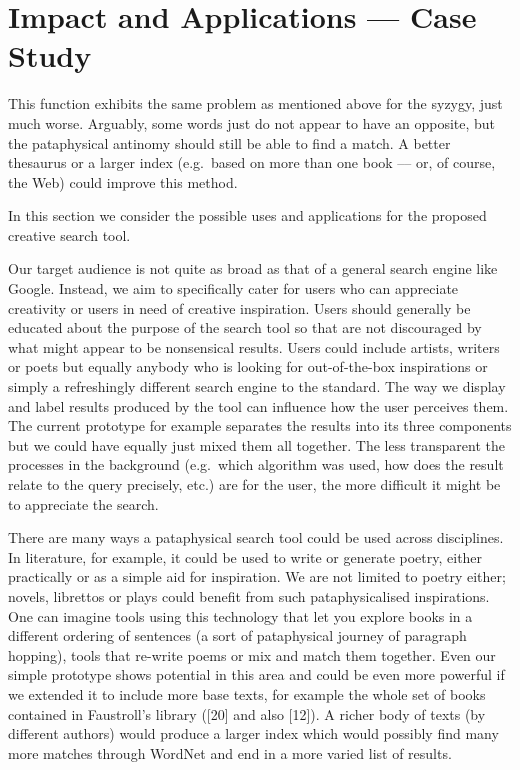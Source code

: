 
\chapter{Impact and Applications --- Case Study}
\label{ch:study}

This function exhibits the same problem as mentioned above for the syzygy, just much worse. Arguably, some words just do not appear to have an opposite, but the pataphysical antinomy should still be able to find a match. A better thesaurus or a larger index (e.g.\ based on more than one book –-- or, of course, the Web) could improve this method.

\grule


In this section we consider the possible uses and applications for the proposed creative search tool.

Our target audience is not quite as broad as that of a general search engine like Google. Instead, we aim to specifically cater for users who can appreciate creativity or users in need of creative inspiration. Users should generally be educated about the purpose of the search tool so that are not discouraged by what might appear to be nonsensical results. Users could include artists, writers or poets but equally anybody who is looking for out-of-the-box inspirations or simply a refreshingly different search engine to the standard.
The way we display and label results produced by the tool can influence how the user perceives them. The current prototype for example separates the results into its three components but we could have equally just mixed them all together. The less transparent the processes in the background (e.g.\ which algorithm was used, how does the result relate to the query precisely, etc.) are for the user, the more difficult it might be to appreciate the search.

There are many ways a pataphysical search tool could be used across disciplines.
In literature, for example, it could be used to write or generate poetry, either practically or as a simple aid for inspiration. We are not limited to poetry either; novels, librettos or plays could benefit from such pataphysicalised inspirations. One can imagine tools using this technology that let you explore books in a different ordering of sentences (a sort of pataphysical journey of paragraph hopping), tools that re-write poems or mix and match them together. Even our simple prototype shows potential in this area and could be even more powerful if we extended it to include more base texts, for example the whole set of books contained in Faustroll’s library ([20] and also [12]). A richer body of texts (by different authors) would produce a larger index which would possibly find many more matches through WordNet and end in a more varied list of results.

